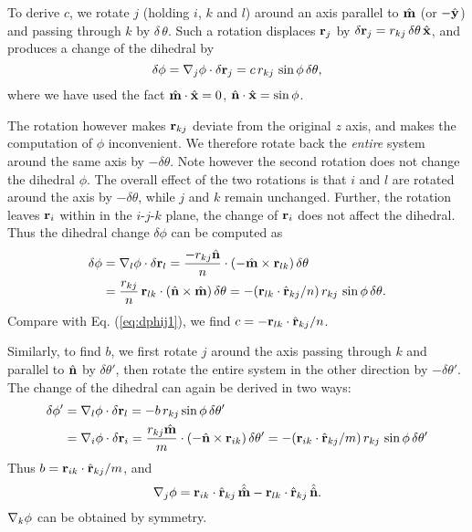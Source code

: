 \documentclass{article}
\begin{document}
To derive $c$, we rotate $j$ (holding $i$, $k$ and $l$) around 
an axis parallel to $\hat{\mathbf{m}}$ (or $-\hat{\mathbf{y}}$) and passing through $k$ by $\delta \, \theta$.
Such a rotation displaces $\mathbf{r}_j$ by 
%
$\delta \mathbf{r}_j = r_{kj} \, \delta \theta \, \hat{\mathbf{x}}$,
%
and produces a change of the dihedral by
\begin{equation}
\delta \phi
  = \nabla_j \phi \cdot \delta \mathbf{r}_j 
  = c \, r_{kj} \, \sin \phi \, \delta \theta, 
\label{eq:dphij1}
\end{equation}
where we have used the fact $\hat{\mathbf{m}} \cdot \hat{\mathbf{x}} = 0$, $\hat{\mathbf{n}} \cdot \hat{\mathbf{x}} = \sin \phi$.


The rotation however makes $\mathbf{r}_{kj}$ deviate from the original $z$ axis,
  and makes the computation of $\phi$ inconvenient.
We therefore rotate back the \emph{entire} system around the same axis by $-\delta \theta$.
Note however the second rotation does not change the dihedral $\phi$.
The overall effect of the two rotations is that 
  $i$ and $l$ are rotated around the axis by $-\delta \theta$, 
   while $j$ and $k$ remain unchanged.
%
%
Further, the rotation leaves $\mathbf{r}_i$ within in the $i$-$j$-$k$ plane,
the change of $\mathbf{r}_i$ does not affect the dihedral.
%
Thus the dihedral change $\delta \phi$ can be computed as 
\begin{equation*}
\begin{split}
\delta \phi
  &= \nabla_l \phi \cdot \delta \mathbf{r}_l = 
 \frac{-r_{kj} \hat{\mathbf{n}}}{n} \cdot (-\hat{\mathbf{m}} \times \mathbf{r}_{lk}) \, \delta \theta  \\
  &= \frac{r_{kj}}{n} \, \mathbf{r}_{lk} \cdot (\hat{\mathbf{n}} \times \hat{\mathbf{m}}) \, \delta \theta
  = -(\mathbf{r}_{lk} \cdot \hat{\mathbf{r}}_{kj} / n )\, r_{kj} \, \sin \phi \, \delta \theta.
\end{split}
\end{equation*}
%
Compare with Eq. (\ref{eq:dphij1}), we find $c=-\mathbf{r}_{lk}\cdot\hat{\mathbf{r}}_{kj}/n$.


Similarly, to find $b$, we first rotate $j$ around the axis passing through $k$ 
and parallel to $\hat{\mathbf{n}}$ by $\delta \theta'$,
then rotate the entire system in the other direction by $-\delta \theta'$.
%
The change of the dihedral can again be derived in two ways:
\begin{equation*}
\begin{split}
\delta \phi'
  & = \nabla_l \phi \cdot \delta \mathbf{r}_l = -b \, r_{kj} \sin \phi \, \delta \theta' \\
  & = \nabla_i \phi \cdot \delta \mathbf{r}_i
    = \frac{r_{kj} \hat{\mathbf{m}}} {m} \cdot (-\hat{\mathbf{n}} \times \mathbf{r}_{ik}) \, \delta \theta'
    = - (\mathbf{r}_{ik} \cdot \hat{\mathbf{r}}_{kj}/m) \, r_{k j} \,  \sin \phi \,  \delta \theta'
\end{split}
\end{equation*}
Thus $b = \mathbf{r}_{ik} \cdot \hat{\mathbf{r}}_{kj}/m$, and 
%
\[
  \nabla_j \phi = \mathbf{r}_{ik} \cdot \hat{\mathbf{r}}_{kj} \, \hat{\hat{\mathbf{m}}} - \mathbf{r}_{lk}\cdot \hat{\mathbf{r}}_{kj} \, \hat{\hat{\mathbf{n}}}.
\]
$\nabla_k \phi$ can be obtained by symmetry.
\end{document}
